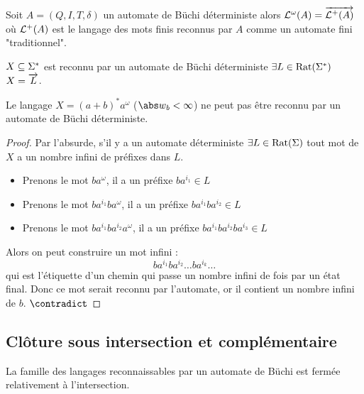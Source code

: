 \begin{prop}[Admis]
	Soit $A = (Q,I,T,\delta)$ un automate de Büchi déterministe alors $\mathcal{L}^{\omega} (A) = \overrightarrow{\mathcal{L}^+ (A)}$
	où $\mathcal{L}^+ (A)$ est le langage des mots finis reconnus par $A$ comme un automate fini "traditionnel".
\end{prop}


\begin{coro}
	$X \subseteq \Sigma^{*}$ est reconnu par un automate de Büchi déterministe \ssi $\exists L \in \text{Rat}(\Sigma^{*})$
	\tq $X = \overrightarrow{L}$.
\end{coro}

\begin{prop}
	Le langage $X = (a+b)^*a^{\omega}$ ($ {\abs w}_b < \infty $) ne peut pas être reconnu par un automate de Büchi déterministe.
\end{prop}

\begin{proof}
	Par l'absurde, s'il y a un automate déterministe $\exists  L \in \text{Rat}(\Sigma)$ \tq tout mot de $X$ a un nombre infini de préfixes dans $L$.

	\begin{itemize}
		\item Prenons le mot $ba^{\omega}$, il a un préfixe $ba^{i_1} \in L$
		\item Prenons le mot $ba^{i_1}ba^{\omega}$, il a un préfixe $ba^{i_1}ba^{i_2} \in L$
		\item Prenons le mot $ba^{i_1}ba^{i_2}a^{\omega}$, il a un préfixe $ba^{i_1}ba^{i_2}ba^{i_3} \in L$
	\end{itemize}

	Alors on peut construire un mot infini :
	$$ ba^{i_1}ba^{i_2}\ldots ba^{i_k}\ldots$$
	qui est l'étiquette d'un chemin qui passe un nombre infini de fois par un état final.
	Donc ce mot serait reconnu par l'automate, or il contient un nombre infini de $b$.  $\contradict$
\end{proof}


\subsection{Clôture sous intersection et complémentaire}

\begin{prop}
	La famille des langages reconnaissables par un automate de Büchi est fermée relativement à l'intersection.
\end{prop}

